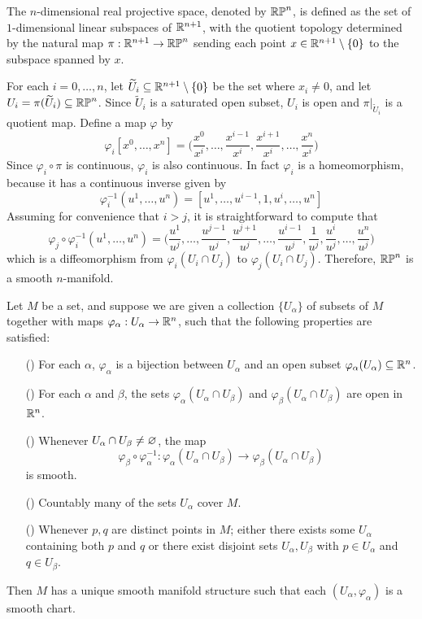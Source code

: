 \begin{example}
The $n$-dimensional real projective space, denoted by $\mathbb{RP}^n$, is defined as the set of $1$-dimensional linear subspaces of $\mathbb{R}^{n+1}$, with the quotient topology determined by the natural map $\pi:\mathbb{R}^{n+1}\to\mathbb{RP}^n$ sending each point $x\in\mathbb{R}^{n+1}\setminus\{0\}$ to the subspace spanned
by $x$.\par
For each $i=0,\dots,n$, let $\widetilde{U}_i\subseteq\mathbb{R}^{n+1}\setminus\{0\}$ be the set where $x_i\neq 0$, and let $U_i=\pi(\widetilde{U}_i)\subseteq\mathbb{RP}^n$. Since $\widetilde{U}_i$ is a saturated open subset, $U_i$ is open and $\pi|_{\widetilde{U}_i}$ is a quotient map. Define a map $\varphi$ by
\[\varphi_i[x^0,\dots,x^{n}]=\Big(\frac{x^0}{x^i},\dots,\frac{x^{i-1}}{x^i},\frac{x^{i+1}}{x^i},\dots,\frac{x^{n}}{x^i}\Big)\]
Since $\varphi_i\circ\pi$ is continuous, $\varphi_i$ is also continuous. In fact $\varphi_i$ is a homeomorphism, because it has a continuous inverse given by
\[\varphi_i^{-1}(u^1,\dots,u^n)=[u^1,\dots,u^{i-1},1,u^i,\dots,u^n]\]
Assuming for convenience that $i>j$, it is straightforward to compute that
\[\varphi_j\circ\varphi_i^{-1}(u^1,\dots,u^n)=\Big(\frac{u^1}{u^j},\dots,\frac{u^{j-1}}{u^j},\frac{u^{j+1}}{u^j},\dots,\frac{u^{i-1}}{u^j},\frac{1}{u^j},\frac{u^i}{u^j},\dots,\frac{u^n}{u^j}\Big)\]
which is a diffeomorphism from $\varphi_i(U_i\cap U_j)$ to $\varphi_j(U_i\cap U_j)$. Therefore, $\mathbb{RP}^n$ is a smooth $n$-manifold.
\end{example}
\begin{lemma}\label{smooth mani chart lem}
Let $M$ be a set, and suppose we are given a collection $\{U_\alpha\}$ of subsets of $M$ together with maps $\varphi_\alpha:U_\alpha\to\mathbb{R}^n$, such
that the following properties are satisfied:
\begin{itemize}
\item[(\rmnum{1})]For each $\alpha$, $\varphi_\alpha$ is a bijection between $U_\alpha$ and an open subset $\varphi_\alpha(U_\alpha)\subseteq\mathbb{R}^n$.
\item[(\rmnum{2})]For each $\alpha$ and $\beta$, the sets $\varphi_\alpha(U_\alpha\cap U_\beta)$ and $\varphi_\beta(U_\alpha\cap U_\beta)$ are open in $\mathbb{R}^n$.
\item[(\rmnum{3})]Whenever $U_\alpha\cap U_\beta\neq\varnothing$, the map
\[\varphi_\beta\circ\varphi_\alpha^{-1}:\varphi_\alpha(U_\alpha\cap U_\beta)\to\varphi_\beta(U_\alpha\cap U_\beta)\] is smooth.
\item[(\rmnum{4})]Countably many of the sets $U_\alpha$ cover $M$.
\item[(\rmnum{5})]Whenever $p,q$ are distinct points in $M$; either there exists some $U_\alpha$ containing both $p$ and $q$ or there exist disjoint sets $U_\alpha,U_\beta$ with $p\in U_\alpha$ and $q\in U_\beta$.
\end{itemize}
Then $M$ has a unique smooth manifold structure such that each $(U_\alpha,\varphi_\alpha)$ is a smooth chart.
\end{lemma}

